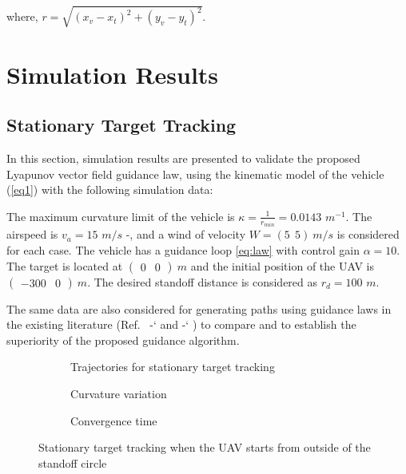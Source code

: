 \documentclass[Afour,sagev,times]{sagej}
\newcommand*{\citen}[1]{%
  \begingroup
    \romannumeral-`\x %
    \setcitestyle{numbers}%
    \cite{#1}%
  \endgroup   
}
\begin{document}
where, $r=\sqrt{(x_v-x_t)^2+(y_v-y_t)^2}$.

\section{Simulation Results}

\subsection{Stationary Target Tracking}

In this section, simulation results are presented to validate the proposed Lyapunov vector field guidance law, using the kinematic model of the vehicle (\ref{eq1}) with the following simulation data: 

The maximum curvature limit of the vehicle is $\kappa =\frac{1}{r_{min}}=0.0143$  $m^{-1}$. The  airspeed is ${v_a}= 15$ $m/s$ \cite{Aviones:UAVFlightSimulator}-\cite{hota2014optimal}, and a wind  of velocity $W=(5~~5)~m/s$ is considered for each case. The vehicle has a guidance loop \eqref{eq:law} with control gain ${\alpha} = 10$. The target is located at $\begin{pmatrix}
0 & 0
\end{pmatrix}~m$ and  the initial position of the UAV is  $\begin{pmatrix}
-300 & 0
\end{pmatrix}~m$. The desired standoff distance is considered as ${r_d}=100$ $m$.

The same data are also considered for generating paths using guidance laws in the existing literature (Ref.~\citen{lawrence2003lyapunov} and \citen{pothen2017curvature}) to compare and to establish the superiority of the proposed guidance algorithm.


\begin{figure}[htpb]
	\begin{subfigure}{0.5\textwidth}
	\centering
	\caption{Trajectories for stationary target tracking}
	\label{fig:traj}
\end{subfigure}
\begin{subfigure}{0.5\textwidth}
	\centering
	\caption{Curvature variation}
	\label{fig:comp}
\end{subfigure}
\begin{subfigure}{0.5\textwidth}
	\centering
	\caption{Convergence time}
	\label{fig:time}
\end{subfigure}
\caption{Stationary target tracking when the UAV starts from outside of the standoff circle}
\label{fig:fig_five}
\end{figure}
\end{document}
